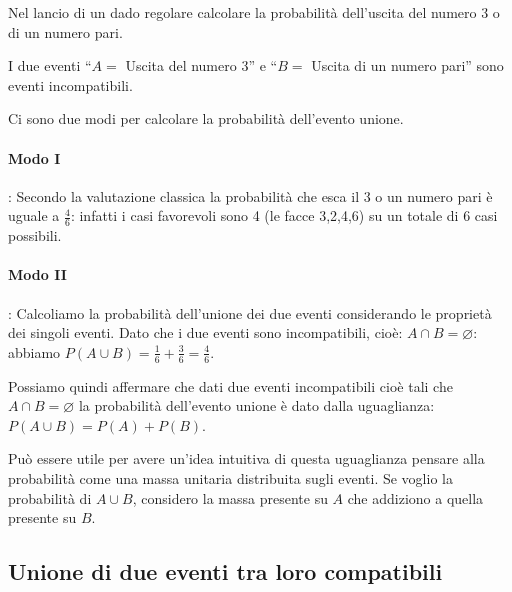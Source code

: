 \begin{esempio}
Nel lancio di un dado regolare calcolare la probabilità dell'uscita del numero 
3 
o di un numero pari.

I due eventi ``$ A= $ Uscita del numero 3'' e ``$ B= $ Uscita di un numero 
pari'' sono eventi incompatibili.

Ci sono due modi per calcolare la probabilità dell'evento unione.
\paragraph{Modo I}: Secondo la valutazione classica la probabilità che esca il 
$3$ o un numero pari è uguale a $\frac 4 6$: infatti i casi favorevoli sono 4 
(le facce 3,2,4,6) su un totale di $6$ casi possibili.
\paragraph{Modo II}: Calcoliamo la probabilità dell'unione dei due eventi 
considerando le proprietà dei singoli eventi. Dato che i due eventi sono 
incompatibili, cioè: $A\cap B=\varnothing $: abbiamo $P(A\cup B)=\frac 1 6+\frac 
3 
6=\frac 4 6$.
\begin{center}
 
\end{center}
\end{esempio}

Possiamo quindi affermare che dati due eventi incompatibili cioè tali che 
$A\cap 
B=\varnothing $ la probabilità dell'evento unione è dato dalla uguaglianza: 
$P(A\cup B)=P(A)+P(B)$.

Può essere utile per avere un'idea intuitiva di questa uguaglianza pensare alla 
probabilità come una massa unitaria distribuita sugli eventi. Se voglio la 
probabilità di $A\cup B$, considero la massa presente su $A$ che addiziono a 
quella presente su $B$.

\subsection{Unione di due eventi tra loro compatibili}

